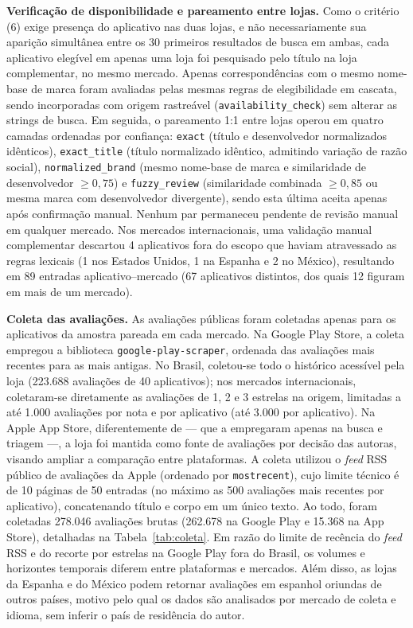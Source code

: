 \textbf{Verificação de disponibilidade e pareamento entre lojas.} Como o critério (6) exige presença do aplicativo nas duas lojas, e não necessariamente sua aparição simultânea entre os 30 primeiros resultados de busca em ambas, cada aplicativo elegível em apenas uma loja foi pesquisado pelo título na loja complementar, no mesmo mercado. Apenas correspondências com o mesmo nome-base de marca foram avaliadas pelas mesmas regras de elegibilidade em cascata, sendo incorporadas com origem rastreável (\texttt{availability\_check}) sem alterar as strings de busca. Em seguida, o pareamento 1:1 entre lojas operou em quatro camadas ordenadas por confiança: \texttt{exact} (título e desenvolvedor normalizados idênticos), \texttt{exact\_title} (título normalizado idêntico, admitindo variação de razão social), \texttt{normalized\_brand} (mesmo nome-base de marca e similaridade de desenvolvedor $\ge 0{,}75$) e \texttt{fuzzy\_review} (similaridade combinada $\ge 0{,}85$ ou mesma marca com desenvolvedor divergente), sendo esta última aceita apenas após confirmação manual. Nenhum par permaneceu pendente de revisão manual em qualquer mercado. Nos mercados internacionais, uma validação manual complementar descartou 4 aplicativos fora do escopo que haviam atravessado as regras lexicais (1 nos Estados Unidos, 1 na Espanha e 2 no México), resultando em 89 entradas aplicativo--mercado (67 aplicativos distintos, dos quais 12 figuram em mais de um mercado).

\textbf{Coleta das avaliações.} As avaliações públicas foram coletadas apenas para os aplicativos da amostra pareada em cada mercado. Na Google Play Store, a coleta empregou a biblioteca \texttt{google-play-scraper}, ordenada das avaliações mais recentes para as mais antigas. No Brasil, coletou-se todo o histórico acessível pela loja (223.688 avaliações de 40 aplicativos); nos mercados internacionais, coletaram-se diretamente as avaliações de 1, 2 e 3 estrelas na origem, limitadas a até 1.000 avaliações por nota e por aplicativo (até 3.000 por aplicativo). Na Apple App Store, diferentemente de \textcite{alsebayel2025} --- que a empregaram apenas na busca e triagem ---, a loja foi mantida como fonte de avaliações por decisão das autoras, visando ampliar a comparação entre plataformas. A coleta utilizou o \textit{feed} RSS público de avaliações da Apple (ordenado por \texttt{mostrecent}), cujo limite técnico é de 10 páginas de 50 entradas (no máximo as 500 avaliações mais recentes por aplicativo), concatenando título e corpo em um único texto. Ao todo, foram coletadas 278.046 avaliações brutas (262.678 na Google Play e 15.368 na App Store), detalhadas na Tabela~\ref{tab:coleta}. Em razão do limite de recência do \textit{feed} RSS e do recorte por estrelas na Google Play fora do Brasil, os volumes e horizontes temporais diferem entre plataformas e mercados. Além disso, as lojas da Espanha e do México podem retornar avaliações em espanhol oriundas de outros países, motivo pelo qual os dados são analisados por mercado de coleta e idioma, sem inferir o país de residência do autor.

